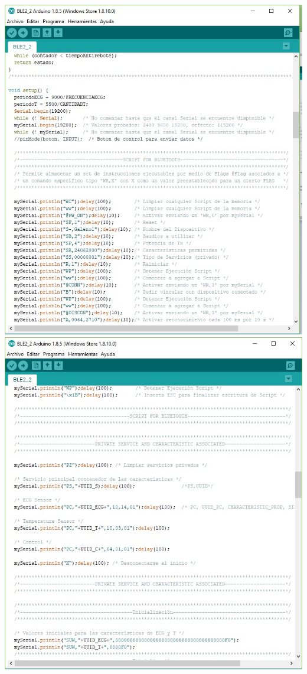 \includegraphics[width=1\textwidth]{figura/anexos/code3.jpg}
\includegraphics[width=1\textwidth]{figura/anexos/code4.jpg}
